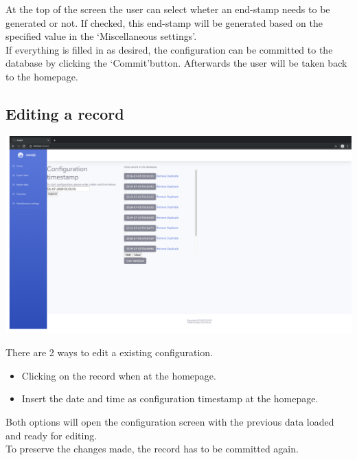 \documentclass[12pt]{article}
\begin{document}
At the top of the screen the user can select wheter an end-stamp needs to be generated or not. If checked, this end-stamp will be generated based on the specified value in the \lq Miscellaneous settings\rq.\\
If everything is filled in as desired, the configuration can be committed to the database by clicking the \lq Commit\rq button. Afterwards the user will be taken back to the homepage.

\subsection{Editing a record}
\begin{center}
	\includegraphics[width=\linewidth]{images/Edit_options.png}
\end{center}
There are 2 ways to edit a existing configuration.
\begin{itemize}
	\item Clicking on the record when at the homepage.
	\item Insert the date and time as configuration timestamp at the homepage.
\end{itemize}
Both options will open the configuration screen with the previous data loaded and ready for editing.\\
To preserve the changes made, the record has to be committed again.
\end{document}
